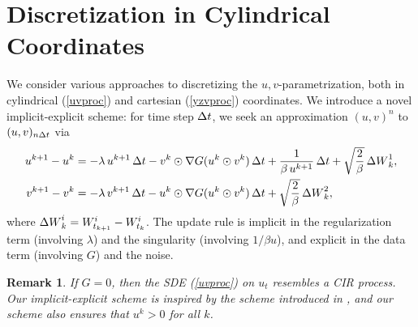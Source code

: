 \documentclass[11pt, twoside]{report}
\newtheorem{remark}{Remark}[theorem]
\begin{document}
\section{Discretization in Cylindrical Coordinates}
We consider various approaches to discretizing the $u,v$-parametrization, both in cylindrical (\ref{uvproc}) and cartesian (\ref{yzvproc}) coordinates.
We introduce a novel implicit-explicit scheme: for time step ${\Delta t}$, we seek an approximation $(u,v)^n$ to $(u,v)_{n {\Delta t}}$ via
\begin{gather}
\begin{split}
u^{k+1}-u^k&=-\lambda\,   u^{k+1}\,{\Delta t} - v^k \odot\nabla G(u^k \odot v^k)\,
{\Delta t}
 +\frac{1}{\beta\, u^{k+1}}\,{\Delta t}+ \sqrt\frac{2}{\beta} \,{\Delta W}^1_{k},\\
v^{k+1}-v^k&=-\lambda\,  v^{k+1}\,{\Delta t} -  u^k\odot \nabla G(u^k \odot v^k)\,{\Delta t}+  \sqrt\frac{2}{\beta}\,{\Delta W}^2_k,
\label{discrete_scheme}
\end{split}
\end{gather}
where ${\Delta W}^i_k=W^i_{t_{k+1}}-W^i_{t_k}$. The update rule is implicit in the regularization term (involving $\lambda$) and the singularity (involving $1/\beta u$), and explicit in the data term (involving $G$) and the noise. 

\begin{remark}
If $G=0$, then the SDE (\ref{uvproc}) on $u_t$ resembles a CIR process. Our implicit-explicit scheme is inspired by the scheme introduced in \cite{Dereich2011-tp}, and our scheme also ensures that $u^k>0$ for all $k$.
\end{remark}
\end{document}
